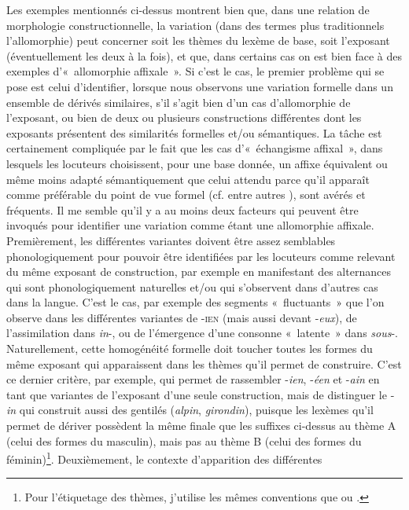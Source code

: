 \documentclass[output=paper]{langsci/langscibook}
\begin{document}
Les exemples mentionnés ci-dessus montrent bien que, dans une relation
de morphologie constructionnelle, la variation (dans des termes plus
traditionnels l'allomorphie) peut concerner soit les thèmes du lexème de
base, soit l'exposant (éventuellement les deux à la fois), et que, dans
certains cas on est bien face à des exemples d'«~allomorphie affixale~».
Si c'est le cas, le premier problème qui se pose est celui d'identifier,
lorsque nous observons une variation formelle dans un ensemble de
dérivés similaires, s'il s'agit bien d'un cas d'allomorphie de
l'exposant, ou bien de deux ou plusieurs constructions différentes dont
les exposants présentent des similarités formelles et/ou sémantiques. La
tâche est certainement compliquée par le fait que les cas d'«~échangisme
affixal~», dans lesquels les locuteurs choisissent, pour une base donnée,
un affixe équivalent ou même moins adapté sémantiquement que celui
attendu parce qu'il apparaît comme préférable du point de vue formel
(cf. entre autres \citealt{Lignon09,Lignon2013,Roche2013}), sont avérés et fréquents. Il me semble qu'il y a au moins deux
facteurs qui peuvent être invoqués pour identifier une variation comme
étant une allomorphie affixale. Premièrement, les différentes variantes
doivent être assez semblables phonologiquement pour pouvoir être
identifiées par les locuteurs comme relevant du même exposant de
construction, par exemple en manifestant des alternances qui sont
phonologiquement naturelles et/ou qui s'observent dans d'autres cas dans
la langue. C'est le cas, par exemple des segments «~fluctuants~» que l'on
observe dans les différentes variantes de -\textsc{ien} (mais aussi
devant -\emph{eux}), de l'assimilation dans \emph{in}-, ou de
l'émergence d'une consonne «~latente~» dans \mbox{\emph{sous}-.} Naturellement,
cette homogénéité formelle doit toucher toutes les formes du même
exposant qui apparaissent dans les thèmes qu'il permet de construire.
C'est ce dernier critère, par exemple, qui permet de rassembler
-\emph{ien}, -\emph{éen} et -\emph{ain} en tant que variantes de
l'exposant d'une seule construction, mais de distinguer le -\emph{in}
qui construit aussi des gentilés (\emph{alpin}, \emph{girondin}),
puisque les lexèmes qu'il permet de dériver possèdent la même finale que
les suffixes ci-dessus au thème A (celui des formes du masculin), mais
pas au thème B (celui des formes du féminin)\footnote{Pour l'étiquetage
  des thèmes, j'utilise les mêmes conventions que %
\citet{Plenat2008b} %
%
ou
\citet{Roche10}%
%
.}. Deuxièmement, le contexte d'apparition des différentes
\end{document}
